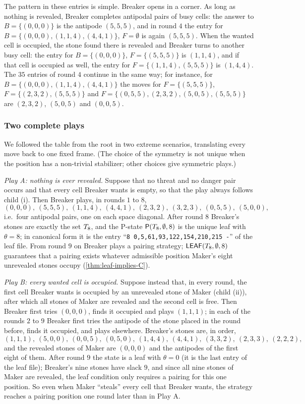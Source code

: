 The pattern in these entries is simple. Breaker opens in a corner. As long as nothing is revealed,
Breaker completes antipodal pairs of busy cells: the answer to $B=\{(0,0,0)\}$ is the antipode $(5,5,5)$, and in
round $4$ the entry for $B=\{(0,0,0),(1,1,4),(4,4,1)\}$, $F=\emptyset$ is again $(5,5,5)$. When the wanted
cell is occupied, the stone found there is revealed and Breaker turns to another busy cell: the entry
for $B=\{(0,0,0)\}$, $F=\{(5,5,5)\}$ is $(1,1,4)$, and if that cell is occupied as well, the entry for
$F=\{(1,1,4),(5,5,5)\}$ is $(1,4,4)$. The $35$ entries of round $4$ continue in the same way; for instance,
for $B=\{(0,0,0),(1,1,4),(4,4,1)\}$ the moves for $F=\{(5,5,5)\}$, $F=\{(2,3,2),(5,5,5)\}$ and
$F=\{(0,5,5),(2,3,2),(5,0,5),(5,5,5)\}$ are $(2,3,2)$, $(5,0,5)$ and $(0,0,5)$.

\subsubsection*{Two complete plays}
We followed the table from the root in two extreme scenarios, translating every move back to one fixed
frame. (The choice of the symmetry is not unique when the position has a non-trivial stabilizer; other
choices give symmetric plays.)

\emph{Play A: nothing is ever revealed.} Suppose that no threat and no danger pair occurs and that every
cell Breaker wants is empty, so that the play always follows child (i). Then Breaker plays, in rounds $1$
to $8$,
\[
(0,0,0),\ (5,5,5),\ (1,1,4),\ (4,4,1),\ (2,3,2),\ (3,2,3),\ (0,5,5),\ (5,0,0),
\]
i.e.\ four antipodal pairs, one on each space diagonal. After round $8$ Breaker's stones are exactly the set
$T_8$, and the P-state $\mathsf{P}(T_8,\emptyset,8)$ is the unique leaf with $\theta=8$; in canonical
form it is the entry ``\texttt{8 0,5,61,93,122,154,210,215 -}'' of the leaf file. From round $9$ on
Breaker plays a pairing strategy; $\mathsf{LEAF}(T_8,\emptyset,8)$ guarantees that a pairing exists whatever
admissible position Maker's eight unrevealed stones occupy (\cref{thm:leaf-implies-C}).

\emph{Play B: every wanted cell is occupied.} Suppose instead that, in every round, the first cell Breaker
wants is occupied by an unrevealed stone of Maker (child (ii)), after which all stones of Maker are
revealed and
the second cell is free. Then Breaker first tries $(0,0,0)$, finds it occupied and plays $(1,1,1)$; in
each of the rounds $2$ to $9$ Breaker first tries the antipode of the stone placed in the round before,
finds it occupied, and plays elsewhere. Breaker's stones are, in order,
\[
(1,1,1),\ (5,0,0),\ (0,0,5),\ (0,5,0),\ (1,4,4),\ (4,4,1),\ (3,3,2),\ (2,3,3),\ (2,2,2),
\]
and the revealed stones of Maker are $(0,0,0)$ and the antipodes of the first eight of them. After round $9$
the state is a leaf with $\theta=0$ (it is the last entry of the leaf file); Breaker's nine stones have
slack $9$, and since all nine stones of Maker are revealed, the leaf condition only requires a pairing for this
one position. So even when Maker ``steals'' every cell that Breaker wants, the strategy reaches a pairing
position one round later than in Play A.


